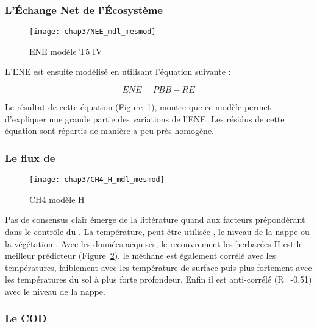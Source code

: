 \subsubsection{L'Échange Net de l'Écosystème}

\begin{figure}
\centering
\texttt{[image: chap3/NEE\_mdl\_mesmod]}
\caption{ENE modèle T5 IV}
\label{fig:ENE_mdl}
\end{figure}

L'ENE est ensuite modélisé en utilisant l'équation suivante :

\begin{equation}
ENE = PBB-RE
\end{equation}

Le résultat de cette équation (Figure~\ref{fig:ENE_mdl}), montre que ce modèle permet d'expliquer une grande partie des variations de l'ENE.
Les résidus de cette équation sont répartis de manière a peu près homogène.

\subsubsection{Le flux de \chh}

\begin{figure}
\centering
\texttt{[image: chap3/CH4\_H\_mdl\_mesmod]}
\caption{CH4 modèle H}
\label{fig:CH4_mdl}
\end{figure}

Pas de consensus clair émerge de la littérature quand aux facteurs prépondérant dans le contrôle du \chh.
La température, peut être utilisée \cite{alm1999,bubier1995}, le niveau de la nappe \cite{bubier1993} ou la végétation \cite{bortoluzzi2006}.
Avec les données acquises, le recouvrement les herbacées H est le meilleur prédicteur (Figure~\ref{fig:CH4_mdl}).
le méthane est également corrélé avec les températures, faiblement avec les température de surface puis plus fortement avec les températures du sol à plus forte profondeur.
Enfin il est anti-corrélé (R=-0.51) avec le niveau de la nappe.


\subsubsection{Le COD}

